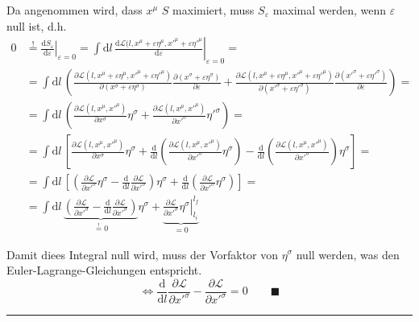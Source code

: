 \documentclass{article}
\newcommand{\diff}{\mathrm{d}}
\newcommand{\lr}[1]{\left(#1\right)}
\newcommand{\lreck}[1]{\left[#1\right]}
\begin{document}
{	Da angenommen wird, dass $x^\mu$ $S$ maximiert, muss $S_\varepsilon$ maximal werden, wenn $\varepsilon$ null ist, d.h.
		\begin{align*}
			0 &\stackrel{!}{=} \left.\frac{\diff S_\varepsilon}{\diff\varepsilon} \right|_{\varepsilon = 0} = \int \diff l\, \left. \frac{\diff \mathcal{L}(l, x^\mu + \varepsilon\eta^\mu, x'^\mu + \varepsilon \eta'^\mu}{\diff\varepsilon} \right|_{\varepsilon = 0} = \\
			&= \int \diff l\, \lr{ \frac{\partial \mathcal{L}(l, x^\mu + \varepsilon\eta^\mu, x'^\mu + \varepsilon \eta'^\mu)}{\partial (x^\sigma + \varepsilon\eta^\sigma)}\frac{\partial (x^\sigma + \varepsilon\eta^\sigma)}{\partial\varepsilon} + \frac{\partial \mathcal{L}(l, x^\mu + \varepsilon\eta^\mu, x'^\mu + \varepsilon \eta'^\mu)}{\partial (x'^\sigma + \varepsilon\eta'^\sigma)}\frac{\partial (x'^\sigma + \varepsilon\eta'^\sigma)}{\partial\varepsilon} } = \\
			&= \int \diff l\, \lr{ \frac{\partial \mathcal{L}(l, x^\mu, x'^\mu)}{\partial x^\sigma}\eta^\sigma + \frac{\partial \mathcal{L}(l, x^\mu, x'^\mu)}{\partial x'^\sigma}\eta'^\sigma } = \\
			&= \int \diff l\, \lreck{ \frac{\partial \mathcal{L}(l, x^\mu, x'^\mu)}{\partial x^\sigma}\eta^\sigma + \frac{\diff}{\diff l} \lr{ \frac{\partial \mathcal{L}(l, x^\mu, x'^\mu)}{\partial x'^\sigma}\eta^\sigma } - \frac{\diff}{\diff l} \lr{ \frac{\partial \mathcal{L}(l, x^\mu, x'^\mu)}{\partial x'^\sigma} } \eta^\sigma } = \\
			&= \int \diff l\, \lreck{ \lr{ \frac{\partial\mathcal{L}}{\partial x'^\sigma}\eta^\sigma - \frac{\diff}{\diff l} \frac{\partial\mathcal{L}}{\partial x'^\sigma} } \eta^\sigma + \frac{\diff}{\diff l} \lr{ \frac{\partial \mathcal{L}}{\partial x'^\sigma}\eta^\sigma } } = \\
			&= \int \diff l\, \underbrace{ \lr{ \frac{\partial\mathcal{L}}{\partial x'^\sigma} - \frac{\diff}{\diff l} \frac{\partial\mathcal{L}}{\partial x'^\sigma} } }_{\stackrel{!}{=}0} \eta^\sigma + \underbrace{ \left.\frac{\partial \mathcal{L}}{\partial x'^\sigma}\eta^\sigma \right|_{l_i}^{l_f} }_{=0}
		\end{align*}

	Damit diees Integral null wird, muss der Vorfaktor von $\eta^\sigma$ null werden, was den Euler-Lagrange-Gleichungen entspricht.
		$$\Leftrightarrow \frac{\diff}{\diff l} \frac{\partial\mathcal{L}}{\partial x'^\sigma} - \frac{\partial\mathcal{L}}{\partial x'^\sigma} = 0 \qquad\blacksquare$$


\hrule
}
\end{document}
